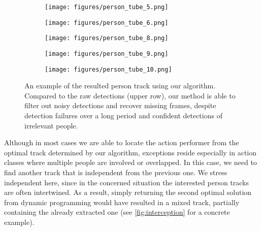 \begin{figure}[h]
\begin{subfigure}{0.12\textwidth}
	\texttt{[image: figures/person\_tube\_5.png]}
\end{subfigure}%
\begin{subfigure}{0.12\textwidth}
	\texttt{[image: figures/person\_tube\_6.png]}
\end{subfigure}%
\begin{subfigure}{0.12\textwidth}
	\texttt{[image: figures/person\_tube\_8.png]}
\end{subfigure}%
\begin{subfigure}{0.12\textwidth}
	\texttt{[image: figures/person\_tube\_9.png]}
\end{subfigure}%
\begin{subfigure}{0.12\textwidth}
	\texttt{[image: figures/person\_tube\_10.png]}
\end{subfigure}
\caption[An sample result of action performer extraction]{An example of the resulted person track using our algorithm. 
Compared to the raw detections (upper row), our method is able to filter out noisy detections and recover missing frames, despite detection failures over a long period and confident detections of irrelevant people.}\label{fig:persontrack}
\end{figure}

Although in most cases we are able to locate the action performer from the optimal track determined by our algorithm, exceptions reside especially in action classes where multiple people are involved or overlapped. 
In this case, we need to find another track that is independent from the previous one. 
We stress independent here, since in the concerned situation the interested person tracks are often intertwined.
As a result, simply returning the second optimal solution from dynamic programming would have resulted in a mixed track, partially containing the already extracted one (see \autoref{fig:interception} for a concrete example).

